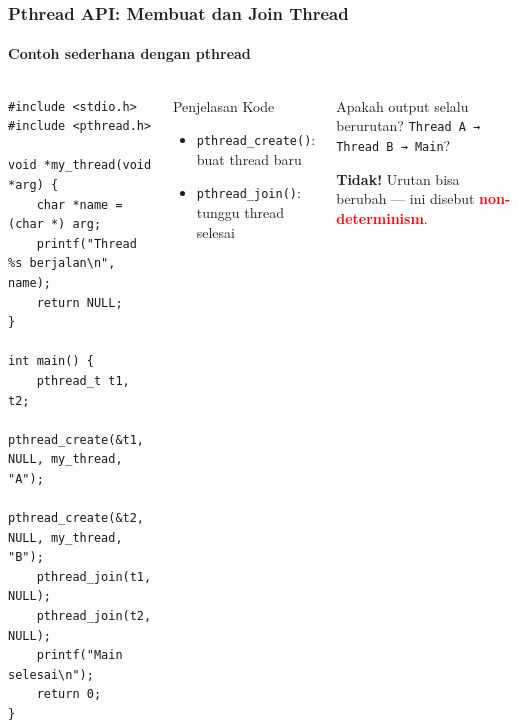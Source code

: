 \documentclass[t,aspectratio=169,xcolor=dvipsnames]{beamer}
\newcommand{\tem}[1]{\textbf{\textcolor{red}{#1}}}
\begin{document}
\begin{frame}[fragile]
    \frametitle{Pthread API: Membuat dan Join Thread}
    \framesubtitle{Contoh sederhana dengan pthread}
    \footnotesize

    \begin{columns}[T]
        \begin{lstlisting}[basicstyle=\ttfamily\scriptsize, breaklines=true]
#include <stdio.h>
#include <pthread.h>

void *my_thread(void *arg) {
    char *name = (char *) arg;
    printf("Thread %s berjalan\n", name);
    return NULL;
}

int main() {
    pthread_t t1, t2;
    pthread_create(&t1, NULL, my_thread, "A");
    pthread_create(&t2, NULL, my_thread, "B");
    pthread_join(t1, NULL);
    pthread_join(t2, NULL);
    printf("Main selesai\n");
    return 0;
}
        \end{lstlisting}

        \begin{block}{Penjelasan Kode}
            \begin{itemize}
                \item \texttt{pthread\_create()}: buat thread baru
                \item \texttt{pthread\_join()}: tunggu thread selesai
            \end{itemize}
        \end{block}

        \vspace{0.2cm}
        \begin{alertblock}{Apakah output selalu berurutan?}
            \texttt{Thread A → Thread B → Main}?

            \vspace{0.1cm}
            \textbf{Tidak!} Urutan bisa berubah — ini disebut \tem{non-determinism}.
        \end{alertblock}
    \end{columns}
\end{frame}
\end{document}

